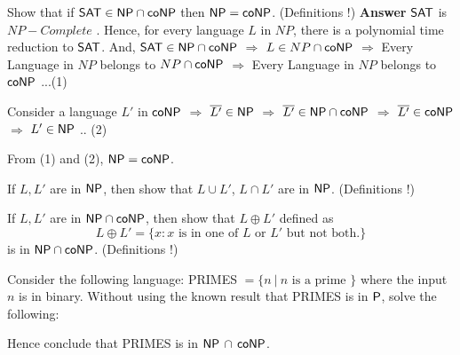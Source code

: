 \documentclass[addpoints,12pt]{exam}
\begin{document}
\begin{questions}


\question[5]
Show that if $\SAT \in \NP \cap \co\NP$ then $\NP = \co\NP$. (Definitions !)
\textbf{Answer} \newline
$\SAT$ is $NP-Complete$ . Hence, for every language $L$ in $NP$, there is a polynomial time reduction to $\SAT$. And,
$\SAT \in \NP \cap \co\NP$ $\Longrightarrow$ $L \in NP \cap \co\NP$ $\Longrightarrow$ Every Language in $NP$ belongs to $NP \cap \co\NP$ $\Longrightarrow$ Every Language in $NP$
 belongs to $\co\NP$ ...(1) \newline
 
 Consider a language $L'$ in $\co\NP$ $\Longrightarrow$ $\overline{L'} \in \NP$ $\Longrightarrow$ $\overline{L'} \in \NP \cap \co\NP$
 $\Longrightarrow$ $\overline{L'} \in \co\NP$ $\Longrightarrow$ $L' \in \NP$ .. (2)
 
 From (1) and (2), $\NP = \co\NP$.


\question[5]
If $L, L'$ are in $\NP$, then show that $L \cup L'$, $L \cap L'$ are in $\NP$. (Definitions !)
  
\question[5]
If $L, L'$ are in $\NP \cap \co\NP$, then show that $L \oplus  L'$ defined as 
\[ L \oplus L' = \{ x : x \textrm{ is in one of $L$ or $L'$ but not both.} \} \]
is in $\NP \cap \co\NP$. (Definitions !)

\question[15]
Consider the following language: PRIMES $= \{ n ~|~ n
\textrm{ is a prime } \}$ where the input $n$ is in binary.  Without
using the known result that PRIMES is in $\P$, solve the following:
Hence conclude that PRIMES is in $\NP$ $\cap$ $\co\NP$.


\end{questions}
\end{document}
